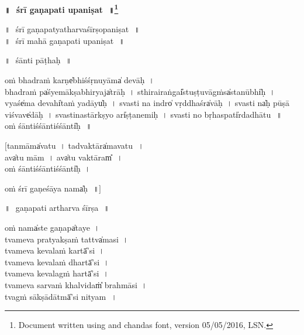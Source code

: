 \documentclass[parskip, DIV=14]{scrartcl}
\renewcommand{\thefootnote}{\fnsymbol{footnote}} %
\begin{document}

\vspace{-1.5cm}

\begin{center}
\textbf{{\Huge॥\,~śrī gaṇapati upaniṣat\,~॥\LARGE\let\thefootnote\relax\footnote{\color{lightgray} Document written using \XeLaTeX{} and chandas font,  version 05/05/2016, LSN.}}}
\end{center}
\Large

\centering	


॥\,~śrī ga॒ṇapatyatharvaśīrṣopaniṣat॒\,~॥\\
\vspace{0.2cm}
॥\,~śrī ma॒hā gaṇapati upaniṣat॒\,~॥ \\

\vspace{1cm}

॥\,~śānti pāṭhaḥ\,~॥ \\
\vspace{0.5cm}


oṁ bha॒draṁ karṇe̍bhiśśṛnu॒yāma̍ devāḥ~। \\
bha॒draṁ pa̍śyemā॒kṣabhi॒ryaja̍trāḥ~। sthi॒rairaṅgai̎stuṣṭu॒vāgṁsa̍sta॒nūbhi̍ḥ~। vyaśe̍ma de॒vahi̍ta॒ṁ yadāyu̍ḥ~।
sva॒sti na॒ indro̍ vṛ॒ddhaśra̍vāḥ~। sva॒sti na̍ḥ pū॒ṣā vi॒śvave̍dāḥ~। sva॒stina॒stārkṣyo॒ ari̍ṣṭanemiḥ~। sva॒sti no॒ bṛha॒spati̍rdadhātu\,~॥\\
 oṁ śānti॒śśānti॒śśānti̍ḥ\,~॥ 

$[$tanmāma̍vatu~। tadva॒ktāra̍mavatu\,~।\\
ava̍tu॒ mām~।
ava̍tu va॒ktāram̎\,~।\\
oṁ śānti॒śśānti॒śśānti̍ḥ~।\\

\vspace{0.8cm}

oṁ śrī gaṇeśāya॒ nama̍ḥ\,~॥$]$ \\

\vspace{1cm}

॥\,~gaṇapati artharva śīrṣa\,~॥ \\

\vspace{0.5cm}

oṁ nama̍ste ga॒ṇapa̍taye~। \\

tvame॒va pra॒tyakṣa॒ṁ tattva̍masi~।  \\
tvame॒va ke॒vala॒ṁ kartā̍’si~। \\
tvame॒va ke॒vala॒ṁ dhartā̍’si~। \\
tvame॒va ke॒vala॒gṁ॒ hartā̍’si~। \\
tvameva sarvaṁ khalvidaṁ̎ brahmā॒si~।  \\
tvagṁ sākṣādātmā̍’si ni॒tyam\,~।\\
\end{document}
